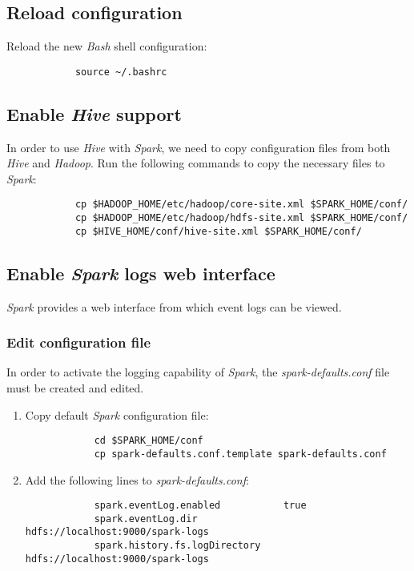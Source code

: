 \documentclass{article}
\begin{document}
        \subsection{Reload configuration}
        Reload the new \emph{Bash} shell configuration:
        \begin{verbatim}
            source ~/.bashrc
        \end{verbatim}

        \subsection{Enable \emph{Hive} support}
        In order to use \emph{Hive} with \emph{Spark}, we need to copy configuration files from both
        \emph{Hive} and \emph{Hadoop}. Run the following commands to copy the necessary files to \emph{Spark}:
        \begin{verbatim}
            cp $HADOOP_HOME/etc/hadoop/core-site.xml $SPARK_HOME/conf/
            cp $HADOOP_HOME/etc/hadoop/hdfs-site.xml $SPARK_HOME/conf/
            cp $HIVE_HOME/conf/hive-site.xml $SPARK_HOME/conf/
        \end{verbatim}

        \subsection{Enable \emph{Spark} logs web interface}
        \emph{Spark} provides a web interface from which event logs can be viewed.
            \subsubsection{Edit configuration file}
            In order to activate the logging capability of \emph{Spark}, the \emph{spark-defaults.conf}
            file must be created and edited.
            \begin{enumerate}
            \item Copy default \emph{Spark} configuration file:
            \begin{verbatim}
            cd $SPARK_HOME/conf
            cp spark-defaults.conf.template spark-defaults.conf
            \end{verbatim}

            \item Add the following lines to \emph{spark-defaults.conf}:
            \begin{verbatim}
            spark.eventLog.enabled           true
            spark.eventLog.dir               hdfs://localhost:9000/spark-logs
            spark.history.fs.logDirectory    hdfs://localhost:9000/spark-logs
            \end{verbatim}
            \end{enumerate}
\end{document}
